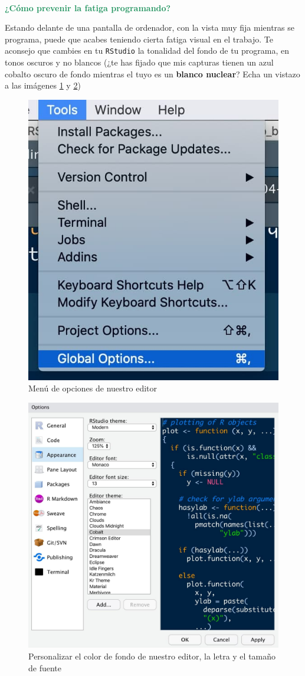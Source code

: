 \documentclass[11pt,]{book}
\begin{document}
~

\textbf{\textcolor{#20935E}{¿Cómo prevenir la fatiga programando?}}

Estando delante de una pantalla de ordenador, con la vista muy fija mientras se programa, puede que acabes teniendo cierta fatiga visual en el trabajo. Te aconsejo que cambies en tu \texttt{RStudio} la tonalidad del fondo de tu programa, en tonos oscuros y no blancos (¿te has fijado que mis capturas tienen un azul cobalto oscuro de fondo mientras el tuyo es un \textbf{blanco nuclear}? Echa un vistazo a las imágenes \ref{fig:menu-1} y \ref{fig:menu-2})

\begin{figure}

{\centering \includegraphics[width=0.5\linewidth,height=0.5\textheight]{./img/menu_1} 

}

\caption{Menú de opciones de nuestro editor}\label{fig:menu-1}
\end{figure}

\begin{figure}

{\centering \includegraphics[width=0.5\linewidth,height=0.5\textheight]{./img/menu_2} 

}

\caption{Personalizar el color de fondo de nuestro editor, la letra y el tamaño de fuente}\label{fig:menu-2}
\end{figure}
\end{document}
